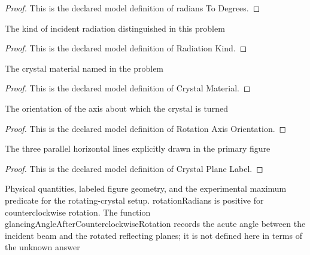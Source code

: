 \begin{proof}
  This is the declared model definition of radians To Degrees.
\end{proof}
\begin{definition}
  \label{def:physics:phyx-mini-0079:phyxminiproblems-problemphyxmini0079-radiationkind}
  The kind of incident radiation distinguished in this problem
\end{definition}
\begin{proof}
  This is the declared model definition of Radiation Kind.
\end{proof}
\begin{definition}
  \label{def:physics:phyx-mini-0079:phyxminiproblems-problemphyxmini0079-crystalmaterial}
  The crystal material named in the problem
\end{definition}
\begin{proof}
  This is the declared model definition of Crystal Material.
\end{proof}
\begin{definition}
  \label{def:physics:phyx-mini-0079:phyxminiproblems-problemphyxmini0079-rotationaxisorientation}
  The orientation of the axis about which the crystal is turned
\end{definition}
\begin{proof}
  This is the declared model definition of Rotation Axis Orientation.
\end{proof}
\begin{definition}
  \label{def:physics:phyx-mini-0079:phyxminiproblems-problemphyxmini0079-crystalplanelabel}
  The three parallel horizontal lines explicitly drawn in the primary figure
\end{definition}
\begin{proof}
  This is the declared model definition of Crystal Plane Label.
\end{proof}
\begin{definition}
  \label{def:physics:phyx-mini-0079:phyxminiproblems-problemphyxmini0079-xraycrystaldiffractionsetup}
  Physical quantities, labeled figure geometry, and the experimental maximum predicate for the rotating-crystal setup. rotationRadians is positive for counterclockwise rotation. The function glancingAngleAfterCounterclockwiseRotation records the acute angle between the incident beam and the rotated reflecting planes; it is not defined here in terms of the unknown answer
\end{definition}
